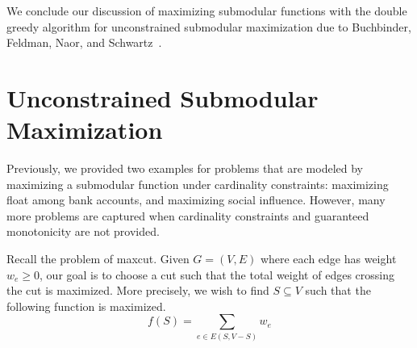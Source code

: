 \documentclass{article}
\begin{document}

We conclude our discussion of maximizing submodular functions with the double greedy algorithm for unconstrained submodular maximization due to Buchbinder, Feldman, Naor, and Schwartz~\cite{BFSS15}.

\section{Unconstrained Submodular Maximization}

Previously, we provided two examples for problems that are modeled by maximizing a submodular function under cardinality constraints: maximizing float among bank accounts, and maximizing social influence. However, many more problems are captured when cardinality constraints and guaranteed monotonicity are not provided.

Recall the problem of maxcut. Given $G = (V, E)$ where each edge has weight $w_e \geq 0$, our goal is to choose a cut such that the total weight of edges crossing the cut is maximized. More precisely, we wish to find $S \subseteq V$ such that the following function is maximized.
\begin{equation}\label{eqn:maxcut}
f(S) = \sum_{e \in E(S, V - S)} w_e
\end{equation}
\end{document}
